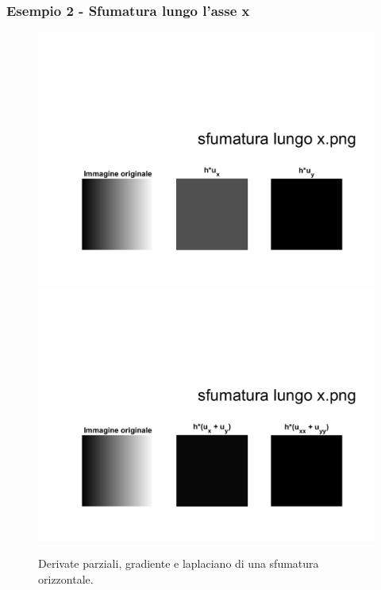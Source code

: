\subsubsection{Esempio 2 - Sfumatura lungo l'asse x}
\begin{figure}[htb] 
\centering
\includegraphics[scale=0.4, trim = 0 2cm 0 11.5cm, clip]{Pictures/Risultati/sfumatura lungo x bianco e nero derivate parziali.png}
\includegraphics[scale=0.4, trim = 0 2cm 0 11.5cm, clip]{Pictures/Risultati/sfumatura lungo x bianco e nero gradiente e laplaciano.png}
\caption{Derivate parziali, gradiente e laplaciano di una sfumatura orizzontale.}\label{fig:figura}
\end{figure}

